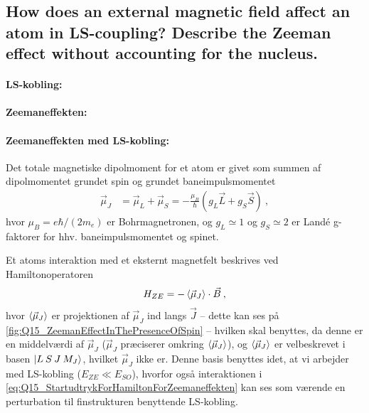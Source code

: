\subsection{How does an external magnetic field affect an atom in LS-coupling? Describe the Zeeman effect without accounting for the nucleus.}


\paragraph{LS-kobling:}


\paragraph{Zeemaneffekten:}


\paragraph{Zeemaneffekten med LS-kobling:} Det totale magnetiske dipolmoment for et atom er givet som summen af dipolmomentet grundet spin og grundet baneimpulsmomentet
\begin{align}
    \Vec{\mu}_J &= \Vec{\mu}_L + \Vec{\mu}_S = - \frac{\mu_B}{\hbar} \left( g_L \Vec{L} + g_S \Vec{S} \right) \: ,
\end{align}
hvor $\mu_B = e\hbar/(2m_e)$ er Bohrmagnetronen, og $g_L \simeq 1$ og $g_S \simeq 2$ er Landé g-faktorer for hhv. baneimpulsmomentet og spinet.

Et atoms interaktion med et eksternt magnetfelt beskrives ved Hamiltonoperatoren
\begin{align} \label{eq:Q15_StartudtrykForHamiltonForZeemaneffekten}
    H_{ZE} = -\Braket{\Vec{\mu}_J} \cdot \Vec{B} \: ,
\end{align}
hvor $\Braket{\Vec{\mu}_J}$ er projektionen af $\Vec{\mu}_J$ ind langs $\Vec{J}$ -- dette kan ses på \cref{fig:Q15_ZeemanEffectInThePresenceOfSpin}
-- hvilken skal benyttes, da denne er en middelværdi af $\Vec{\mu}_J$ ($\Vec{\mu}_J$ præciserer omkring $\Braket{\Vec{\mu}_J}$), og $\Braket{\Vec{\mu}_J}$ er velbeskrevet i basen $\ket{L \: S \: J \: M_J}$, hvilket $\Vec{\mu}_J$ ikke er. Denne basis benyttes idet, at vi arbejder med LS-kobling ($E_{ZE} \ll E_{SO}$), hvorfor også interaktionen i \cref{eq:Q15_StartudtrykForHamiltonForZeemaneffekten} kan ses som værende en perturbation til finstrukturen benyttende LS-kobling.

